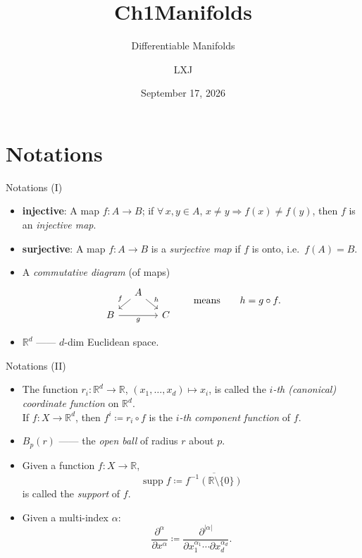 \documentclass[10pt]{beamer}
\title{Ch1\quad Manifolds}
\subtitle{Differentiable Manifolds}
\date{September 17, 2026}
\author{LXJ}
\newcommand{\R}{\mathbb{R}}
\begin{document}
\maketitle

\section{Notations}

\begin{frame}{Notations (I)}
	\begin{itemize}
		\item \textbf{injective}: A map $f: A \to B$; if $\forall\, x, y \in A$,
		      $x \neq y \Rightarrow f(x) \neq f(y)$, then $f$ is an
		      \emph{injective map}.
		\item \textbf{surjective}: A map $f: A \to B$ is a \emph{surjective map}
		      if $f$ is onto, i.e.\ $f(A) = B$.
		\item A \emph{commutative diagram} (of maps)
		      \[
			      \begin{tikzcd}[column sep=small, row sep=small, ampersand replacement=\&]
				      \& A \arrow[dl, "f"'] \arrow[dr, "h"] \& \\
				      B \arrow[rr, "g"'] \& \& C
			      \end{tikzcd}
			      \qquad\text{means}\qquad h = g \circ f .
		      \]
		\item $\R^d$ —— $d$-dim Euclidean space.
	\end{itemize}
\end{frame}

\begin{frame}{Notations (II)}
	\begin{itemize}
		\item The function $r_i: \R^d \to \R$, $(x_1, \dots, x_d) \mapsto x_i$,
		      is called the \emph{$i$-th (canonical) coordinate function} on
		      $\R^d$.\\
		      If $f: X \to \R^d$, then $f^i \coloneqq r_i \circ f$ is the
		      \emph{$i$-th component function} of $f$.
		\item $B_p(r)$ —— the \emph{open ball} of radius $r$ about $p$.
		\item Given a function $f: X \to \R$,
		      \[
			      \operatorname{supp} f \coloneqq \overline{f^{-1}(\R \setminus \{0\})}
		      \]
		      is called the \emph{support} of $f$.
		\item Given a multi-index $\alpha$:
		      \[
			      \frac{\partial^\alpha}{\partial x^\alpha}
			      \coloneqq
			      \frac{\partial^{|\alpha|}}{\partial x_1^{\alpha_1} \cdots \partial x_d^{\alpha_d}} .
		      \]
	\end{itemize}
\end{frame}
\end{document}

